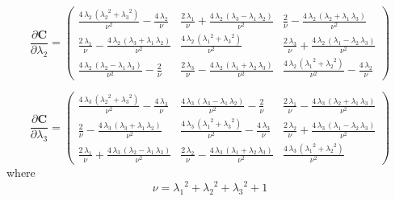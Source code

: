 \begin{equation*}
\frac{\partial \mathbf{C}}{\partial \lambda_2} = 
\left(\begin{array}{ccc} 
\frac{4\, {\lambda_2}\, \left({{\lambda_2}}^2 + {{\lambda_3}}^2\right)}{{\nu}^2} - \frac{4\, {\lambda_2}}{\nu} &
\frac{2\, {\lambda_1}}{\nu} + \frac{4\, {\lambda_2}\, \left({\lambda_3} - {\lambda_1}\, {\lambda_2}\right)}{{\nu}^2} &
\frac{2}{\nu} - \frac{4\, {\lambda_2}\, \left({\lambda_2} + {\lambda_1}\, {\lambda_3}\right)}{{\nu}^2}\\
\frac{2\, {\lambda_1}}{\nu} - \frac{4\, {\lambda_2}\, \left({\lambda_3} + {\lambda_1}\, {\lambda_2}\right)}{{\nu}^2} &
\frac{4\, {\lambda_2}\, \left({{\lambda_1}}^2 + {{\lambda_3}}^2\right)}{{\nu}^2} & \frac{2\, {\lambda_3}}{\nu} + \frac{4\, {\lambda_2}\, \left({\lambda_1} - {\lambda_2}\, {\lambda_3}\right)}{{\nu}^2}\\
\frac{4\, {\lambda_2}\, \left({\lambda_2} - {\lambda_1}\, {\lambda_3}\right)}{{\nu}^2} - \frac{2}{\nu} &
\frac{2\, {\lambda_3}}{\nu} - \frac{4\, {\lambda_2}\, \left({\lambda_1} + {\lambda_2}\, {\lambda_3}\right)}{{\nu}^2} &
\frac{4\, {\lambda_2}\, \left({{\lambda_1}}^2 + {{\lambda_2}}^2\right)}{{\nu}^2} - \frac{4\, {\lambda_2}}{\nu} \end{array}\right)
\end{equation*}

\begin{equation*}
\frac{\partial \mathbf{C}}{\partial \lambda_3} = 
\left(\begin{array}{ccc} \frac{4\, {\lambda_3}\, \left({{\lambda_2}}^2 + {{\lambda_3}}^2\right)}{{\nu}^2} - \frac{4\, {\lambda_3}}{\nu} & \frac{4\, {\lambda_3}\, \left({\lambda_3} - {\lambda_1}\, {\lambda_2}\right)}{{\nu}^2} - \frac{2}{\nu} & \frac{2\, {\lambda_1}}{\nu} - \frac{4\, {\lambda_3}\, \left({\lambda_2} + {\lambda_1}\, {\lambda_3}\right)}{{\nu}^2}\\ \frac{2}{\nu} - \frac{4\, {\lambda_3}\, \left({\lambda_3} + {\lambda_1}\, {\lambda_2}\right)}{{\nu}^2} & \frac{4\, {\lambda_3}\, \left({{\lambda_1}}^2 + {{\lambda_3}}^2\right)}{{\nu}^2} - \frac{4\, {\lambda_3}}{\nu} & \frac{2\, {\lambda_2}}{\nu} + \frac{4\, {\lambda_3}\, \left({\lambda_1} - {\lambda_2}\, {\lambda_3}\right)}{{\nu}^2}\\ \frac{2\, {\lambda_1}}{\nu} + \frac{4\, {\lambda_3}\, \left({\lambda_2} - {\lambda_1}\, {\lambda_3}\right)}{{\nu}^2} & \frac{2\, {\lambda_2}}{\nu} - \frac{4\, {\lambda_3}\, \left({\lambda_1} + {\lambda_2}\, {\lambda_3}\right)}{{\nu}^2} & \frac{4\, {\lambda_3}\, \left({{\lambda_1}}^2 + {{\lambda_2}}^2\right)}{{\nu}^2} \end{array}\right)
\end{equation*}
where
\begin{equation*}
\nu = {\lambda_1}^2 + {\lambda_2}^2 + {\lambda_3}^2 + 1
\end{equation*}


